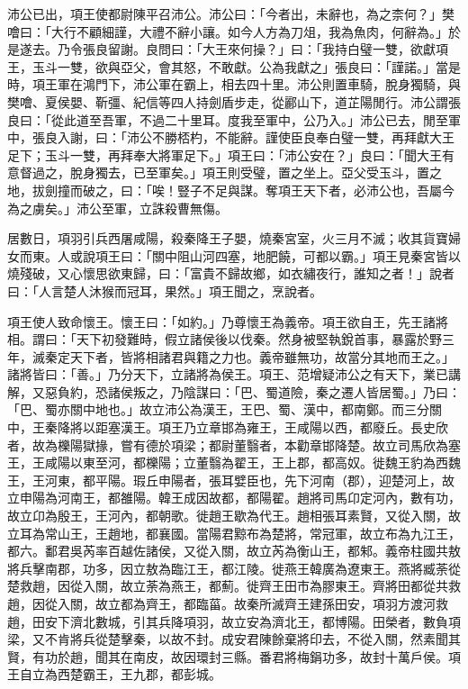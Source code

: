 \begin{pinyinscope}
沛公已出，項王使都尉陳平召沛公。沛公曰：「今者出，未辭也，為之柰何？」樊噲曰：「大行不顧細謹，大禮不辭小讓。如今人方為刀俎，我為魚肉，何辭為。」於是遂去。乃令張良留謝。良問曰：「大王來何操？」曰：「我持白璧一雙，欲獻項王，玉斗一雙，欲與亞父，會其怒，不敢獻。公為我獻之」張良曰：「謹諾。」當是時，項王軍在鴻門下，沛公軍在霸上，相去四十里。沛公則置車騎，脫身獨騎，與樊噲、夏侯嬰、靳彊、紀信等四人持劍盾步走，從酈山下，道芷陽閒行。沛公謂張良曰：「從此道至吾軍，不過二十里耳。度我至軍中，公乃入。」沛公已去，閒至軍中，張良入謝，曰：「沛公不勝桮杓，不能辭。謹使臣良奉白璧一雙，再拜獻大王足下；玉斗一雙，再拜奉大將軍足下。」項王曰：「沛公安在？」良曰：「聞大王有意督過之，脫身獨去，已至軍矣。」項王則受璧，置之坐上。亞父受玉斗，置之地，拔劍撞而破之，曰：「唉！豎子不足與謀。奪項王天下者，必沛公也，吾屬今為之虜矣。」沛公至軍，立誅殺曹無傷。

居數日，項羽引兵西屠咸陽，殺秦降王子嬰，燒秦宮室，火三月不滅；收其貨寶婦女而東。人或說項王曰：「關中阻山河四塞，地肥饒，可都以霸。」項王見秦宮皆以燒殘破，又心懷思欲東歸，曰：「富貴不歸故鄉，如衣繡夜行，誰知之者！」說者曰：「人言楚人沐猴而冠耳，果然。」項王聞之，烹說者。

項王使人致命懷王。懷王曰：「如約。」乃尊懷王為義帝。項王欲自王，先王諸將相。謂曰：「天下初發難時，假立諸侯後以伐秦。然身被堅執銳首事，暴露於野三年，滅秦定天下者，皆將相諸君與籍之力也。義帝雖無功，故當分其地而王之。」諸將皆曰：「善。」乃分天下，立諸將為侯王。項王、范增疑沛公之有天下，業已講解，又惡負約，恐諸侯叛之，乃陰謀曰：「巴、蜀道險，秦之遷人皆居蜀。」乃曰：「巴、蜀亦關中地也。」故立沛公為漢王，王巴、蜀、漢中，都南鄭。而三分關中，王秦降將以距塞漢王。項王乃立章邯為雍王，王咸陽以西，都廢丘。長史欣者，故為櫟陽獄掾，嘗有德於項梁；都尉董翳者，本勸章邯降楚。故立司馬欣為塞王，王咸陽以東至河，都櫟陽；立董翳為翟王，王上郡，都高奴。徙魏王豹為西魏王，王河東，都平陽。瑕丘申陽者，張耳嬖臣也，先下河南（郡），迎楚河上，故立申陽為河南王，都雒陽。韓王成因故都，都陽翟。趙將司馬卬定河內，數有功，故立卬為殷王，王河內，都朝歌。徙趙王歇為代王。趙相張耳素賢，又從入關，故立耳為常山王，王趙地，都襄國。當陽君黥布為楚將，常冠軍，故立布為九江王，都六。鄱君吳芮率百越佐諸侯，又從入關，故立芮為衡山王，都邾。義帝柱國共敖將兵擊南郡，功多，因立敖為臨江王，都江陵。徙燕王韓廣為遼東王。燕將臧荼從楚救趙，因從入關，故立荼為燕王，都薊。徙齊王田市為膠東王。齊將田都從共救趙，因從入關，故立都為齊王，都臨菑。故秦所滅齊王建孫田安，項羽方渡河救趙，田安下濟北數城，引其兵降項羽，故立安為濟北王，都博陽。田榮者，數負項梁，又不肯將兵從楚擊秦，以故不封。成安君陳餘棄將印去，不從入關，然素聞其賢，有功於趙，聞其在南皮，故因環封三縣。番君將梅鋗功多，故封十萬戶侯。項王自立為西楚霸王，王九郡，都彭城。


\end{pinyinscope}
